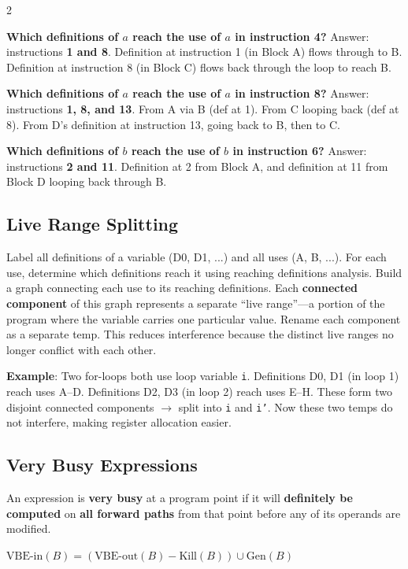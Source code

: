\documentclass[9pt,landscape]{extarticle}
\begin{document}
\begin{multicols}{2}
\begin{exambox}
\textbf{Which definitions of $a$ reach the use of $a$ in instruction 4?} Answer: instructions \textbf{1 and 8}. Definition at instruction 1 (in Block A) flows through to B. Definition at instruction 8 (in Block C) flows back through the loop to reach B.

\textbf{Which definitions of $a$ reach the use of $a$ in instruction 8?} Answer: instructions \textbf{1, 8, and 13}. From A via B (def at 1). From C looping back (def at 8). From D's definition at instruction 13, going back to B, then to C.

\textbf{Which definitions of $b$ reach the use of $b$ in instruction 6?} Answer: instructions \textbf{2 and 11}. Definition at 2 from Block A, and definition at 11 from Block D looping back through B.
\end{exambox}

\subsection{Live Range Splitting}

Label all definitions of a variable (D0, D1, ...) and all uses (A, B, ...). For each use, determine which definitions reach it using reaching definitions analysis. Build a graph connecting each use to its reaching definitions. Each \textbf{connected component} of this graph represents a separate ``live range''---a portion of the program where the variable carries one particular value. Rename each component as a separate temp. This reduces interference because the distinct live ranges no longer conflict with each other.

\textbf{Example}: Two for-loops both use loop variable \texttt{i}. Definitions D0, D1 (in loop 1) reach uses A--D. Definitions D2, D3 (in loop 2) reach uses E--H. These form two disjoint connected components $\to$ split into \texttt{i} and \texttt{i'}. Now these two temps do not interfere, making register allocation easier.

\subsection{Very Busy Expressions}

An expression is \textbf{very busy} at a program point if it will \textbf{definitely be computed} on \textbf{all forward paths} from that point before any of its operands are modified.

$\text{VBE-in}(B) = (\text{VBE-out}(B) - \text{Kill}(B)) \cup \text{Gen}(B)$


\end{multicols}
\end{document}
